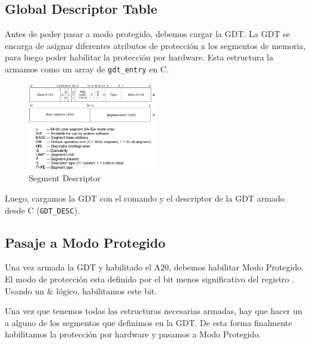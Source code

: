 \subsection{Global Descriptor Table}
Antes de poder pasar a modo protegido, debemos cargar la GDT. La GDT se encarga de asignar diferentes atributos de protección a los segmentos de memoria, para luego poder habilitar la protección por hardware. Esta estructura la armamos como un array de \texttt{gdt\_entry} en C.

\begin{figure}[h!]
  \centering
    \includegraphics[width=0.5\textwidth]{images/segment_descriptor}
  \caption{Segment Descriptor}
\end{figure}

Luego, cargamos la GDT con el comando  y el descriptor de la GDT armado desde C (\texttt{GDT\_DESC}).

\subsection{Pasaje a Modo Protegido}
Una vez armada la GDT y habilitado el A20, debemos habilitar Modo Protegido. El modo de protección esta definido por el bit menos significativo del registro . Usando un \& lógico, habilitamos este bit.

Una vez que tenemos todas las estructuras necesarias armadas, hay que hacer un  a alguno de los segmentos que definimos en la GDT. De esta forma finalmente habilitamos la protección por hardware y pasamos a Modo Protegido. 

